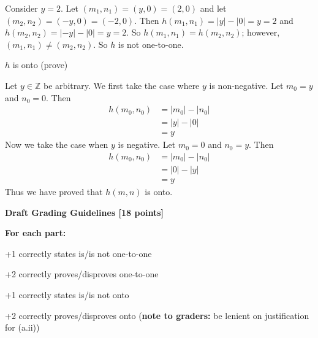 \documentclass[12pt]{exam}
\begin{document}
\begin{solution}
\begin{qparts}
\begin{qsubparts}
        Consider $y = 2$. Let $(m_1, n_1) = (y, 0) = (2, 0)$ and let $(m_2, n_2) = (-y, 0) = (-2, 0)$. Then $h(m_1, n_1) = |y| - |0| = y = 2$ and $h(m_2, n_2) = |-y| - |0| = y = 2$. So $h(m_1, n_1) = h(m_2, n_2)$; however, $(m_1, n_1) \neq (m_2, n_2)$. So $h$ is not one-to-one.
        
        \item $h$ is onto (prove)
        
        Let $y \in \mathbb Z$ be arbitrary. We first take the case where $y$ is non-negative. Let $m_0 = y$ and $n_0 = 0$. Then
        \begin{align*}
            h(m_0, n_0) 
            &= |m_0| - |n_0| \\
            &= |y| - |0| \\
            &= y
        \end{align*}
        Now we take the case when $y$ is negative. Let $m_0 = 0$ and $n_0 = y$. Then
        \begin{align*}
            h(m_0, n_0)
            &= |m_0| - |n_0| \\
            &= |0| - |y| \\
            &= y
        \end{align*}
        Thus we have proved that $h(m, n)$ is onto.
    \end{qsubparts}
\end{qparts}


\textbf{Draft Grading Guidelines [18 points]}

\textbf{For each part:}
\begin{guidelines}
    \item +1 correctly states is/is not one-to-one
    \item +2 correctly proves/disproves one-to-one
    \item +1 correctly states is/is not onto
    \item +2 correctly proves/disproves onto (\textbf{note to graders:} be lenient on justification for (a.ii))
\end{guidelines}
\end{solution}
\end{document}
